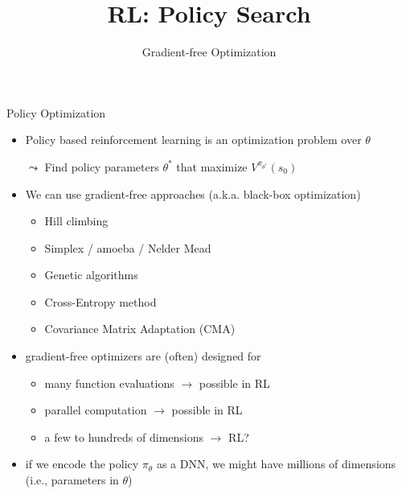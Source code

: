 \documentclass[aspectratio=169]{../latex_main/tntbeamer}  %
\title[RL: Gradient-free]{RL: Policy Search}
\subtitle{Gradient-free Optimization}
\begin{document}
	
	\maketitle

\begin{frame}[c]{Policy Optimization}

\begin{itemize}
	\item Policy based reinforcement learning is an \alert{optimization} problem over $\theta$
	\item[$\leadsto$] Find policy parameters $\theta^*$ that maximize $V^{\pi_{\theta^*}}(s_0)$
	\item We can use gradient-free approaches (a.k.a. black-box optimization)
	\begin{itemize}
		\item Hill climbing
		\item Simplex / amoeba / Nelder Mead
		\item Genetic algorithms
		\item Cross-Entropy method
		\item Covariance Matrix Adaptation (CMA)
	\end{itemize}
	\pause
	\smallskip
	\item gradient-free optimizers are (often) designed for
	\begin{itemize}
		\item many function evaluations $\to$ possible in RL
		\item parallel computation $\to$ possible in RL
		\item a few to hundreds of dimensions $\to$ RL?
	\end{itemize}
	\pause
	\item if we encode the policy $\pi_\theta$ as a DNN, we might have \alert{millions} of dimensions\\ (i.e., parameters in $\theta$)

\end{itemize}

\end{frame}
\end{document}
